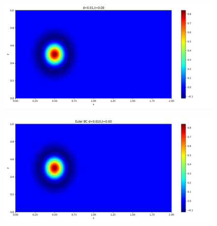 \documentclass[12pt]{article}
\begin{document}
\begin{figure}[H]
\centering
\begin{minipage}{\linewidth}
\centering
\begin{minipage}{0.5\textwidth}
\includegraphics[width=\linewidth]{figures/3d0.01t0.00.png}
\label{fig1}
\end{minipage}\hfill
\begin{minipage}{0.5\textwidth}
\includegraphics[width=\linewidth]{figures/3Ed0.010t0.00.png}
\label{fig2}
\end{minipage}
\vspace{-1.5em}


\end{minipage}
\end{figure}
\end{document}
